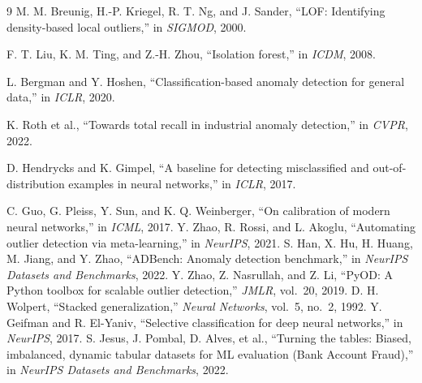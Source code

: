 \documentclass[11pt,titlepage]{article}
\begin{document}
\begin{thebibliography}{9}
M. M. Breunig, H.-P. Kriegel, R. T. Ng, and J. Sander, ``LOF: Identifying density-based local outliers,'' in \emph{SIGMOD}, 2000.

F. T. Liu, K. M. Ting, and Z.-H. Zhou, ``Isolation forest,'' in \emph{ICDM}, 2008.

L. Bergman and Y. Hoshen, ``Classification-based anomaly detection for general data,'' in \emph{ICLR}, 2020.

K. Roth et al., ``Towards total recall in industrial anomaly detection,'' in \emph{CVPR}, 2022.

D. Hendrycks and K. Gimpel, ``A baseline for detecting misclassified and out-of-distribution examples in neural networks,'' in \emph{ICLR}, 2017.

C. Guo, G. Pleiss, Y. Sun, and K. Q. Weinberger, ``On calibration of modern neural networks,'' in \emph{ICML}, 2017.
Y. Zhao, R. Rossi, and L. Akoglu, ``Automating outlier detection via meta-learning,'' in \emph{NeurIPS}, 2021.
S. Han, X. Hu, H. Huang, M. Jiang, and Y. Zhao, ``ADBench: Anomaly detection benchmark,'' in \emph{NeurIPS Datasets and Benchmarks}, 2022.
Y. Zhao, Z. Nasrullah, and Z. Li, ``PyOD: A Python toolbox for scalable outlier detection,'' \emph{JMLR}, vol.~20, 2019.
D. H. Wolpert, ``Stacked generalization,'' \emph{Neural Networks}, vol.~5, no.~2, 1992.
Y. Geifman and R. El-Yaniv, ``Selective classification for deep neural networks,'' in \emph{NeurIPS}, 2017.
S. Jesus, J. Pombal, D. Alves, et al., ``Turning the tables: Biased, imbalanced, dynamic tabular datasets for ML evaluation (Bank Account Fraud),'' in \emph{NeurIPS Datasets and Benchmarks}, 2022.
\end{thebibliography}
\end{document}
